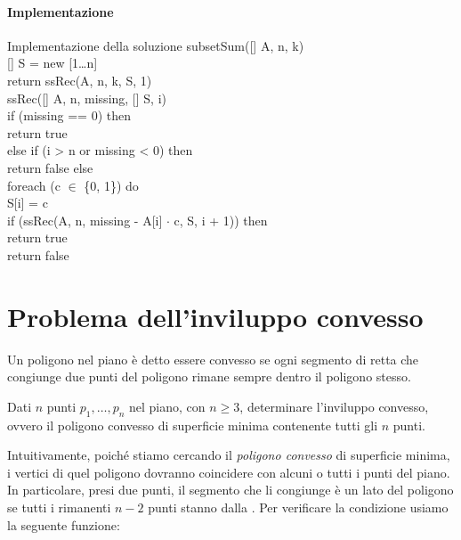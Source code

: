\paragraph{Implementazione}
\begin{minicode}{Implementazione della soluzione}
\ind{} subsetSum([] A,  n,  k)\\
    [] S = new [1\dots n]\\
    return ssRec(A, n, k, S, 1)\\

\ind{} ssRec([] A,  n,  missing, [] S,  i)\\
    \indf if (missing == 0) then\\
        return true\\
    \indf else if (i > n or missing < 0) then\\
        return false\hfill{}
    \indf else\\
        \indff foreach (c $\in$ \{0, 1\}) do\\
            S[i] = c\\
            \indfff if (ssRec(A, n, missing - A[i] $\cdot$ c, S, i + 1)) then\\
                return true\\
        \indff return false
\end{minicode}

\section{Problema dell'inviluppo convesso}
\begin{definition}
    Un poligono nel piano è detto essere convesso se ogni segmento di retta
    che congiunge due punti del poligono rimane sempre dentro il poligono
    stesso.
\end{definition}
\begin{problem}
    Dati $n$ punti $p_1,\dots,p_n$ nel piano, con $n\geq 3$, determinare
    l'inviluppo convesso, ovvero il poligono convesso di superficie minima
    contenente tutti gli $n$ punti.
\end{problem}

\noindent
Intuitivamente, poiché stiamo cercando il \emph{poligono convesso} di superficie
minima, i vertici di quel poligono dovranno coincidere con alcuni o tutti i
punti del piano. In particolare, presi due punti, il segmento che li congiunge è
un lato del poligono se tutti i rimanenti $n-2$ punti stanno dalla . Per verificare la condizione usiamo la seguente funzione:

